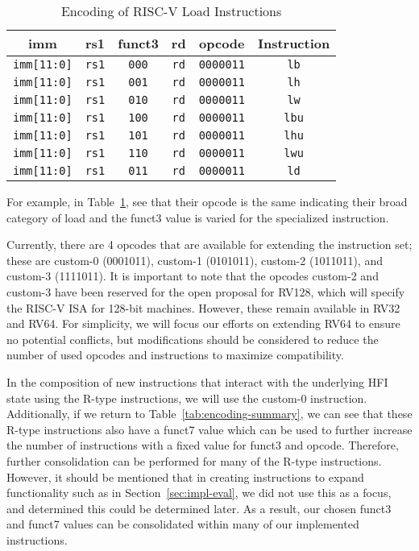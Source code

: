 \documentclass[conference,compsoc]{IEEEtran}
\begin{document}
\begin{table}[H]
  \centering
  \caption{Encoding of RISC-V Load Instructions}
  \small
  {
  \begin{tabular}{|c|c|c|c|c|c|}
    \hline
    \textbf{imm} & \textbf{rs1} & \textbf{funct3} & \textbf{rd} & \textbf{opcode} & \textbf{Instruction} \\
    \hline
    \texttt{imm[11:0]} & \texttt{rs1} & \texttt{000} & \texttt{rd} & \texttt{0000011} & \texttt{lb} \\
    \texttt{imm[11:0]} & \texttt{rs1} & \texttt{001} & \texttt{rd} & \texttt{0000011} & \texttt{lh} \\
    \texttt{imm[11:0]} & \texttt{rs1} & \texttt{010} & \texttt{rd} & \texttt{0000011} & \texttt{lw} \\
    \texttt{imm[11:0]} & \texttt{rs1} & \texttt{100} & \texttt{rd} & \texttt{0000011} & \texttt{lbu} \\
    \texttt{imm[11:0]} & \texttt{rs1} & \texttt{101} & \texttt{rd} & \texttt{0000011} & \texttt{lhu} \\
    \texttt{imm[11:0]} & \texttt{rs1} & \texttt{110} & \texttt{rd} & \texttt{0000011} & \texttt{lwu} \\
    \texttt{imm[11:0]} & \texttt{rs1} & \texttt{011} & \texttt{rd} & \texttt{0000011} & \texttt{ld} \\
    \hline
  \end{tabular}
  }
  \label{tab:load-instructions}
\end{table}

For example, in Table~\ref{tab:load-instructions}, see that their opcode is the same indicating their broad category of load and the funct3 value is varied for the specialized instruction.

Currently, there are 4 opcodes that are available for extending the instruction set; these are custom-0 (0001011), custom-1 (0101011), custom-2 (1011011), and custom-3 (1111011).
It is important to note that the opcodes custom-2 and custom-3 have been reserved for the open proposal for RV128, which will specify the RISC-V ISA for 128-bit machines. 
However, these remain available in RV32 and RV64. 
For simplicity, we will focus our efforts on extending RV64 to ensure no potential conflicts, but modifications should be considered to reduce the number of used opcodes and instructions to maximize compatibility.

In the composition of new instructions that interact with the underlying HFI state using the R-type instructions, we will use the custom-0 instruction.
Additionally, if we return to Table~\ref{tab:encoding-summary}, we can see that these R-type instructions also have a funct7 value which can be used to further increase the number of instructions with a fixed value for funct3 and opcode. 
Therefore, further consolidation can be performed for many of the R-type instructions. 
However, it should be mentioned that in creating instructions to expand functionality such as in Section~\ref{sec:impl-eval}, we did not use this as a focus, and determined this could be determined later.
As a result, our chosen funct3 and funct7 values can be consolidated within many of our implemented instructions.
\end{document}

